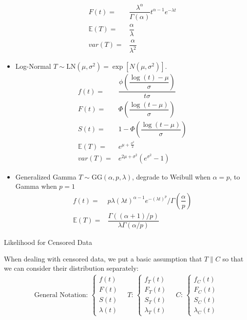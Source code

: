 \begin{itemize}[topsep=2pt,itemsep=0pt]
\begin{align}
        F(t)=&\dfrac{\lambda ^\alpha}{\Gamma (\alpha )} t^{\alpha -1}e^{-\lambda t}\\
        \mathbb{E}(T)=&\dfrac{\alpha }{\lambda }\\
        var(T)=&\dfrac{\alpha }{\lambda ^2}
    \end{align}
    \item Log-Normal $T\sim \mathrm{LN}(\mu ,\sigma ^2)=\exp\left[ N(\mu ,\sigma ^2) \right]$.
    \begin{align}
        f(t)=&\dfrac{\phi(\dfrac{\log(t)-\mu }{\sigma })}{t\sigma }\\
        F(t)=&\Phi\left(\dfrac{\log(t-\mu )}{\sigma }\right)\\
        S(t)=&1-\Phi\left(\dfrac{\log(t-\mu )}{\sigma }\right)\\
        \mathbb{E}(T)=&e^{\mu +\frac{\sigma ^2}{2}}\\
        var(T)=&e^{2\mu +\sigma ^2}(e^{\sigma ^2}-1)
    \end{align}
    \item Generalized Gamma $T\sim \mathrm{GG}(\alpha ,p,\lambda )$, degrade to Weibull when $ \alpha =p $, to Gamma when $ p=1 $
    \begin{align}
        f(t)=&p\lambda (\lambda t)^{\alpha -1}e^{-(\lambda t)^p}\Big/ \Gamma (\dfrac{\alpha }{p})\\
        \mathbb{E}(T)=&\dfrac{\Gamma ((\alpha +1)/p)}{\lambda \Gamma (\alpha /p)} 
    \end{align}
\end{itemize}


\begin{point}
    Likelihood for Censored Data
\end{point}

When dealing with censored data, we put a basic assumption that $ T\parallel C $ so that we can consider their distribution separately:
\begin{align}
    \text{General Notation: }\begin{cases}
        f(t)\\
        F(t)\\
        S(t)\\
        \lambda (t)
    \end{cases}\quad
    T:\,\begin{cases}
        f_T(t)\\
        F_T(t)\\
        S_T(t)\\
        \lambda_T(t)
    \end{cases}
    \quad C:\,\begin{cases}
        f_C(t)\\
        F_C(t)\\
        S_C(t)\\
        \lambda _C (t)
    \end{cases}
\end{align}

